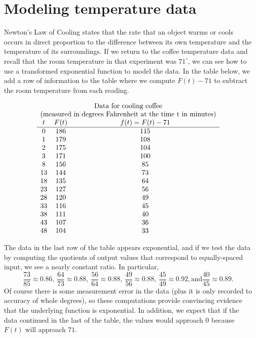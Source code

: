 \documentclass[nooutcomes]{ximera}
\begin{document}

\section{Modeling temperature data}
Newton's Law of Cooling  states that the rate that an object warms or cools occurs in direct proportion to the difference between its own temperature and the temperature of its surroundings.  If we return to the coffee temperature data  and recall that the room temperature in that experiment was $71^\circ$, we can see how to use a transformed exponential function to model the data.  In the table below, we add a row of information to the table where we compute $F(t)-71$ to subtract the room temperature from each reading.

$$
\begin{array}{ccc}
\multicolumn{3}{c}{\text{Data for cooling coffee}}\\
\multicolumn{3}{c}{\text{(measured in degrees Fahrenheit at the time t in minutes)}}\\
t&F(t)&f(t)=F(t)-71\\
\hline
0&186&115\\
1&179&108\\
2&175&104\\
3&171&100\\
8&156&85\\
13&144&73\\
18&135&64\\
23&127&56\\
28&120&49\\
33&116&45\\
38&111&40\\
43&107&36\\
48&104&33
\end{array}
$$

The data in the last row of the table appears exponential, and if we test the data by computing the quotients of output values that correspond to equally-spaced input, we see a nearly constant ratio.  In particular,%
\begin{equation*}
\frac{73}{85} \approx 0.86, \ \frac{64}{73} \approx 0.88, \ \frac{56}{64} \approx 0.88, \ \frac{49}{56} \approx 0.88, \ \frac{45}{49} \approx 0.92, \text{and} \frac{40}{45} \approx 0.89 \text{.}
\end{equation*}
Of course there is some measurement error in the data (plus it is only recorded to accuracy of whole degrees), so these computations provide convincing evidence that the underlying function is exponential.  In addition, we expect that if the data continued in the last of the table, the values would approach $0$ because $F(t)$ will approach $71$.
\end{document}
